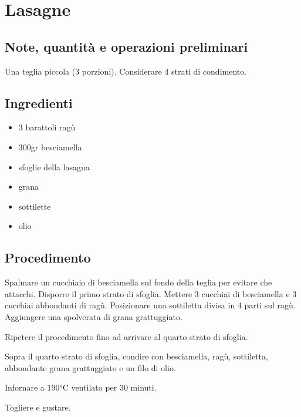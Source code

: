 \documentclass[12pt]{article}
\begin{document}
\newpage


\section{Lasagne}

\subsection*{Note, quantità e operazioni preliminari}
Una teglia piccola (3 porzioni).
Considerare 4 strati di condimento.

\bigskip
\bigskip

\begin{multicols}{2}
\subsection*{Ingredienti}
\begin{itemize}
	\item 3 barattoli ragù
	\item 300gr besciamella
	\item sfoglie della lasagna
	\item grana
	\item sottilette
	\item olio
\end{itemize}

\vspace*{\fill}

\columnbreak
\subsection*{Procedimento}

Spalmare un cucchiaio di besciamella sul fondo della teglia
per evitare che attacchi. Disporre il primo strato di sfoglia. 
Mettere 3 cucchiai di besciamella e 3 cucchiai abbondanti
di ragù. Posizionare una sottiletta divisa in 4 parti sul ragù.
Aggiungere una spolverata di grana grattuggiato.
\medskip

Ripetere il procedimento fino ad arrivare al quarto strato di 
sfoglia.
\medskip

Sopra il quarto strato di sfoglia, condire con besciamella,
ragù, sottiletta, abbondante grana grattuggiato e un filo di olio.
\medskip

Infornare a 190°C ventilato per 30 minuti.
\medskip

Togliere e gustare.

\end{multicols}

\newpage
\end{document}
